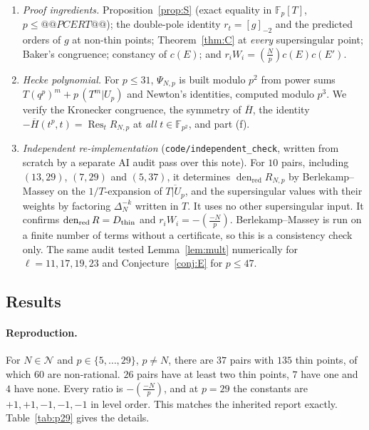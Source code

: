 \documentclass[11pt,a4paper]{article}
\numberwithin{equation}{section}
\theoremstyle{definition}
\theoremstyle{remark}
\newcommand{\Fp}{\mathbb F_p}
\newcommand{\Fq}{\mathbb F_{p^2}}
\newcommand{\Res}{\operatorname{Res}}
\newcommand{\den}{\operatorname{den}_{\mathrm{red}}}
\newcommand{\Lp}[1]{\left(\frac{#1}{p}\right)}
\begin{document}
\begin{enumerate}[label=(\arabic*)]
proven Kaneko--Zagier lemma, not on the conjecture. Tier 2 agrees with Tier 1 wherever both were run.
\item \emph{Proof ingredients.} Proposition~\ref{prop:S} (exact equality in $\Fp[T]$, $p\le @@PCERT@@$);
the double-pole identity $r_t=[g]_{-2}$ and the predicted orders of $g$ at non-thin points;
Theorem~\ref{thm:C} at \emph{every} supersingular point; Baker's congruence; constancy of $c(E)$;
and $r_iW_i=\Lp Nc(E)c(E')$.
\item \emph{Hecke polynomial.} For $p\le31$, $\Psi_{N,p}$ is built modulo $p^2$ from power sums
$T(q^p)^m+p\,(T^m|U_p)$ and Newton's identities, computed modulo $p^3$. We verify the Kronecker
congruence, the symmetry of $\overline H$, the identity $-\overline H(t^p,t)=\Res_tR_{N,p}$ at
\emph{all} $t\in\Fq$, and part (f).
\item \emph{Independent re-implementation} (\texttt{code/independent\_check}, written from scratch by a separate
AI audit pass over this note). For $10$ pairs, including $(13,29)$, $(7,29)$ and $(5,37)$, it determines
$\den R_{N,p}$ by Berlekamp--Massey on the $1/T$-expansion of $\overline{T|U_p}$, and the supersingular values with
their weights by factoring $\Delta_N^{-k}$ written in $T$. It uses no other supersingular input. It confirms
$\den R=D_{\rm thin}$ and $r_iW_i=-\Lp{-N}$. Berlekamp--Massey is run on a finite number of terms without a
certificate, so this is a consistency check only. The same audit tested Lemma~\ref{lem:mult} numerically for
$\ell=11,17,19,23$ and Conjecture~\ref{conj:E} for $p\le47$.
\end{enumerate}

\subsection{Results}
\paragraph{Reproduction.} For $N\in\mathcal N$ and $p\in\{5,\dots,29\}$, $p\ne N$, there are $37$
pairs with $135$ thin points, of which $60$ are non-rational. $26$ pairs have at least two thin
points, $7$ have one and $4$ have none. Every ratio is $-\Lp{-N}$, and at $p=29$ the constants are
$+1,+1,-1,-1,-1$ in level order. This matches the inherited report exactly. Table~\ref{tab:p29}
gives the details.
\end{document}
